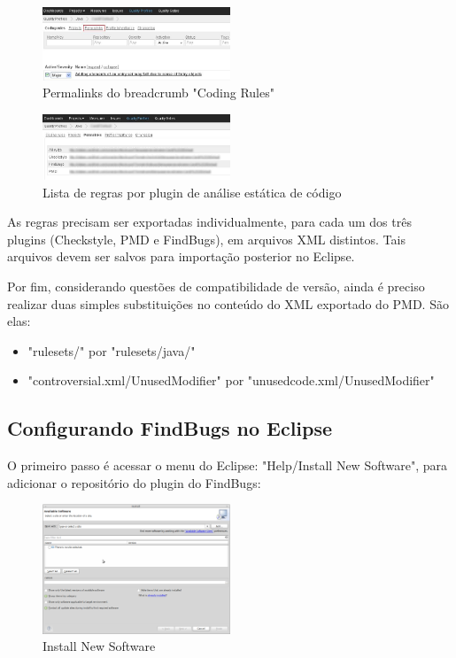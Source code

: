 \documentclass[12pt,journal,compsoc]{IEEEtran}
\begin{document}
\begin{figure}[ht!]
\centering
\includegraphics[width=0.5\textwidth]{img/sonar-step-03}
\caption{Permalinks do breadcrumb "Coding Rules"}
\label{sonar-step-03}
\end{figure} 

\begin{figure}[ht!]
\centering
\includegraphics[width=0.5\textwidth]{img/sonar-step-04}
\caption{Lista de regras por plugin de análise estática de código}
\label{sonar-step-04}
\end{figure} 

As regras precisam ser exportadas individualmente, para cada um dos três plugins (Checkstyle, PMD e FindBugs), em arquivos XML distintos. Tais arquivos devem ser salvos para importação posterior no Eclipse.

Por fim, considerando questões de compatibilidade de versão, ainda é preciso realizar duas simples substituições no conteúdo do XML exportado do PMD. São elas:

\begin{itemize}
\item "rulesets/" por "rulesets/java/"
\item "controversial.xml/UnusedModifier" por "unusedcode.xml/UnusedModifier"
\end{itemize}


\subsection{Configurando FindBugs no Eclipse}

O primeiro passo é acessar o menu do Eclipse: "Help/Install New Software", para adicionar o repositório do plugin do FindBugs\cite{FindBugs_eclipse_plugin}:

\begin{figure}[ht!]
\centering
\includegraphics[width=0.5\textwidth]{img/eclipse-findbugs-01}
\caption{Install New Software}
\label{eclipse-findbugs-01}
\end{figure}
\end{document}
